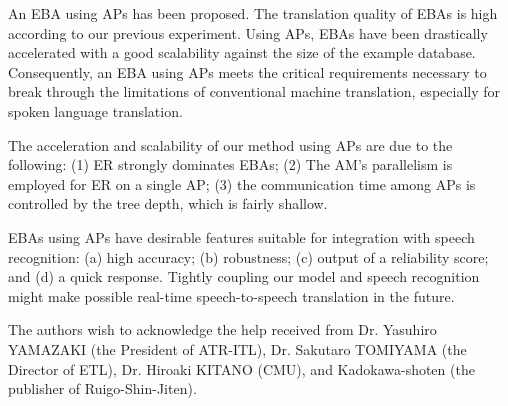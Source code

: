 An EBA using APs has been proposed.
The translation quality of EBAs is high
according to our previous experiment. 
Using APs, EBAs have been drastically accelerated
with a good scalability against the size of the example database.
Consequently, an EBA using APs meets the critical requirements necessary to
break through the limitations of conventional machine 
translation, especially for spoken language translation. 

The acceleration and scalability of our method  using APs are due to 
the following: 
(1) ER strongly dominates EBAs;
(2) The AM's parallelism is employed for ER on a single AP;
(3) the  communication time among APs is controlled by the 
tree depth, which is fairly shallow.

EBAs using APs have desirable features 
suitable for integration with speech recognition:
(a) high accuracy; (b) robustness; 
(c)  output of a reliability score;
and (d) a quick response.
Tightly coupling our model and speech recognition might make possible
real-time speech-to-speech translation in the future.


\acknowledgment

The authors wish to acknowledge the help received from 
Dr. Yasuhiro YAMAZAKI (the President of ATR-ITL),  
Dr. Sakutaro TOMIYAMA (the Director of ETL), 
Dr. Hiroaki KITANO (CMU), and 
Kadokawa-shoten (the publisher of Ruigo-Shin-Jiten).




\newpage

